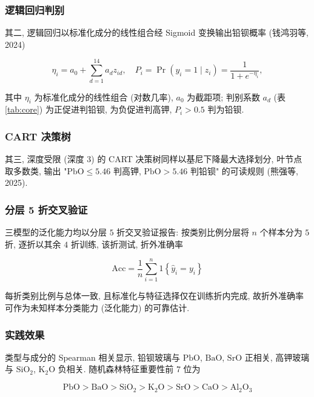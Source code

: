 \documentclass{ctexart}
\begin{document}
\subsubsection{逻辑回归判别}

其二, 逻辑回归以标准化成分的线性组合经 Sigmoid 变换输出铅钡概率 (钱鸿羽等, 2024)

\begin{equation*}
\eta_{i}=a_{0}+\sum_{d=1}^{14}a_{d}z_{id},\quad{P}_{i}=\Pr\left(y_{i}=1\mid{z}_{i}\right)=\frac{1}{1+e^{-\eta_{i}}},
\end{equation*}

其中 $\eta_i$ 为标准化成分的线性组合 (对数几率), $a_0$ 为截距项; 判别系数 $a_d$ (表 \ref{tab:core}) 为正促进判铅钡, 为负促进判高钾, $P_i>0.5$ 判为铅钡.

\subsubsection{CART 决策树}

其三, 深度受限 (深度 $3$) 的 CART 决策树同样以基尼下降最大选择划分, 叶节点取多数类, 输出 "$\mathrm{PbO}\le5.46$ 判高钾, $\mathrm{PbO}>5.46$ 判铅钡" 的可读规则 (熊强等, 2025).


\subsubsection{分层 5 折交叉验证}

三模型的泛化能力均以分层 $5$ 折交叉验证报告: 按类别比例分层将 $n$ 个样本分为 $5$ 折, 逐折以其余 $4$ 折训练, 该折测试, 折外准确率

\begin{equation*}
\mathrm{Acc}=\frac{1}{n}\sum_{i=1}^{n}\mathrm{1}\left\{\widehat{y}_{i}=y_{i}\right\}
\end{equation*}

每折类别比例与总体一致, 且标准化与特征选择仅在训练折内完成, 故折外准确率可作为未知样本分类能力 (泛化能力) 的可靠估计.


\subsubsection{实践效果}

类型与成分的 Spearman 相关显示, 铅钡玻璃与 $\mathrm{PbO}$, $\mathrm{BaO}$, $\mathrm{SrO}$ 正相关, 高钾玻璃与 $\mathrm{SiO_2}$, $\mathrm{K_2O}$ 负相关. 随机森林特征重要性前 $7$ 位为

\begin{equation*}
\mathrm{PbO}>\mathrm{BaO}>\mathrm{SiO_2}>\mathrm{K_2O}>\mathrm{SrO}>\mathrm{CaO}>\mathrm{Al_2O_3}
\end{equation*}
\end{document}
